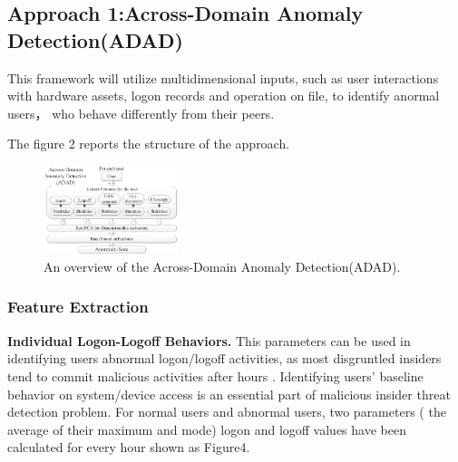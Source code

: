 \documentclass[conference]{IEEEtran}
\begin{document}
\subsection{Approach 1:Across-Domain Anomaly Detection(ADAD)}\label{AA}

This framework will utilize multidimensional inputs, such as user interactions with hardware
assets, logon records and operation on file, to identify anormal users， who behave differently from their peers.

The figure 2 reports the structure of the approach.


\begin{figure}[htb]
\centerline{\includegraphics[width = 0.35\textwidth]{figure/figure3.eps}}
\caption{An overview of the Across-Domain Anomaly Detection(ADAD).}
\label{fig}
\end{figure}

\subsubsection{Feature Extraction}


\textbf{Individual Logon-Logoff Behaviors.} This parameters can be used in identifying users abnormal logon/logoff activities, as most disgruntled insiders tend to commit malicious activities after hours \cite{b40}. Identifying users’ baseline behavior on system/device access is an essential part of malicious insider threat detection problem. For normal users and abnormal users, two parameters ( the average of their maximum and mode) logon and logoff values have been calculated for every hour shown as Figure4. 
\end{document}
